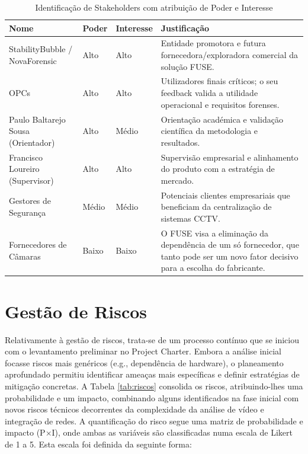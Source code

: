 \begin{table}[H]
\centering
\caption{Identificação de Stakeholders com atribuição de Poder e Interesse}
\label{tab:stakeholders}
\begin{tabular}{lllp{6cm}}
\toprule
\textbf{Nome} & \textbf{Poder} & \textbf{Interesse} & \textbf{Justificação} \\
\midrule
StabilityBubble / NovaForensic & Alto & Alto & Entidade promotora e futura fornecedora/exploradora comercial da solução \gls{FUSE}. \\
\glspl{OPC} & Alto & Alto & Utilizadores finais críticos; o seu feedback valida a utilidade operacional e requisitos forenses. \\
Paulo Baltarejo Sousa (Orientador) & Alto & Médio & Orientação académica e validação científica da metodologia e resultados. \\
Francisco Loureiro (Supervisor) & Alto & Alto & Supervisão empresarial e alinhamento do produto com a estratégia de mercado. \\
Gestores de Segurança & Médio & Médio & Potenciais clientes empresariais que beneficiam da centralização de sistemas \gls{CCTV}. \\
Fornecedores de Câmaras & Baixo & Baixo & O \gls{FUSE} visa a eliminação da dependência de um só fornecedor, que tanto pode ser um novo fator decisivo para a escolha do fabricante. \\
\bottomrule
\end{tabular}
\end{table}

\section{Gestão de Riscos}
\label{subsec:risk_management}

Relativamente à gestão de riscos, trata-se de um processo contínuo que se iniciou com o levantamento preliminar no Project Charter. Embora a análise inicial focasse riscos mais genéricos (e.g., dependência de hardware), o planeamento aprofundado permitiu identificar ameaças mais específicas e definir estratégias de mitigação concretas. A Tabela \ref{tab:riscos} consolida os riscos, atribuindo-lhes uma probabilidade e um impacto, combinando alguns identificados na fase inicial com novos riscos técnicos decorrentes da complexidade da análise de vídeo e integração de redes. A quantificação do risco segue uma matriz de probabilidade e impacto (P×I), onde ambas as variáveis são classificadas numa escala de Likert \cite{Likert1932} de 1 a 5. Esta escala foi definida da seguinte forma:

